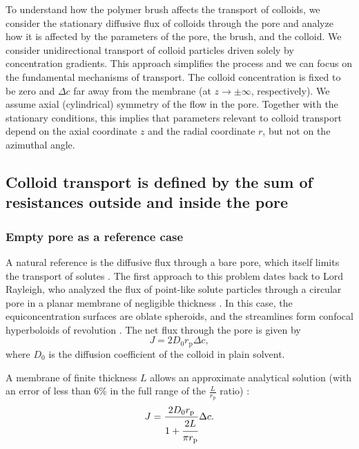 \documentclass[12pt, a4paper]{article}
\begin{document}
To understand how the polymer brush affects the transport of colloids, we consider the stationary diffusive flux of colloids through the pore and analyze how it is affected by the parameters of the pore, the brush, and the colloid.
We consider unidirectional transport of colloid particles driven solely by concentration gradients.
This approach simplifies the process and we can focus on the fundamental mechanisms of transport.
The colloid concentration is fixed to be zero and $\Delta c$ far away from the membrane (at $z\rightarrow\pm\infty$, respectively).
We assume axial (cylindrical) symmetry of the flow in the pore.
Together with the stationary conditions, this implies that parameters relevant to colloid transport depend on the axial coordinate $z$ and the radial coordinate $r$, but not on the azimuthal angle.


\subsection{Colloid transport is defined by the sum of resistances outside and inside the pore}

\subsubsection{Empty pore as a reference case}

A natural reference is the diffusive flux through a bare pore, which itself limits the transport of solutes \cite{Deen1987, Sun2024}.
The first approach to this problem dates back to Lord Rayleigh, who analyzed the flux of point-like solute particles through a circular pore in a planar membrane of negligible thickness \cite{Strutt1878}.
In this case, the equiconcentration surfaces are oblate spheroids, and the streamlines form confocal hyperboloids of revolution \cite{Cooke1966}.
The net flux through the pore is given by
\begin{equation}
    J=2D_0r_{\text{p}}\Delta c,
    \label{eq:flux_Ral}
\end{equation}
where $D_0$ is the diffusion coefficient of the colloid in plain solvent.

A membrane of finite thickness $L$ allows an approximate analytical solution (with an error of less than 6\% in the full range of the $\frac{L}{r_{\text{p}}}$ ratio) \cite{Brunn1984}:
\begin{equation}
    J=\frac{2 D_0 r_{\text{p}}}{1+\cfrac{2L}{\pi r_{\text{p}}}}\Delta c.
    \label{eq:flux_finlength}
\end{equation}
\end{document}
